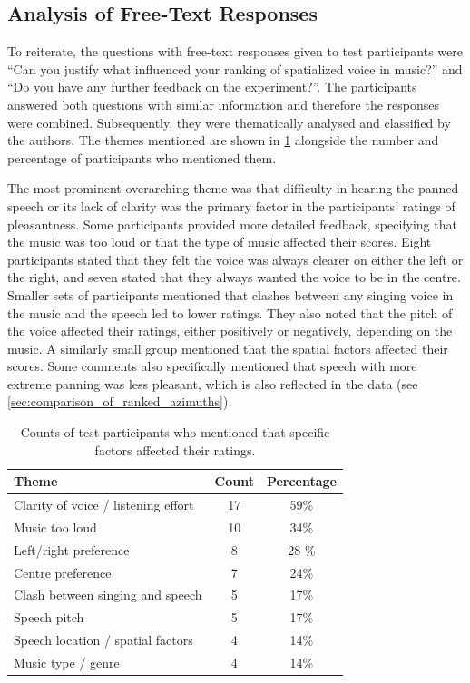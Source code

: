\documentclass[fleqn]{jaes}
\begin{document}
\subsection{Analysis of Free-Text Responses}
To reiterate, the questions with free-text responses given to test participants were \enquote{Can you justify what influenced your ranking of spatialized voice in music?} and \enquote{Do you have any further feedback on the experiment?}. The participants answered both questions with similar information and therefore the responses were combined. Subsequently, they were thematically analysed and classified by the authors. The themes mentioned are shown in \cref{table:freetextthemes} alongside the number and percentage of participants who mentioned them.

The most prominent overarching theme was that difficulty in hearing the panned speech or its lack of clarity was the primary factor in the participants' ratings of pleasantness. Some participants provided more detailed feedback, specifying that the music was too loud or that the type of music affected their scores. Eight participants stated that they felt the voice was always clearer on either the left or the right, and seven stated that they always wanted the voice to be in the centre. Smaller sets of participants mentioned that clashes between any singing voice in the music and the speech led to lower ratings. They also noted that the pitch of the voice affected their ratings, either positively or negatively, depending on the music. A similarly small group mentioned that the spatial factors affected their scores. Some comments also specifically mentioned that speech with more extreme panning was less pleasant, which is also reflected in the data (see \cref{sec:comparison_of_ranked_azimuths}).

\begin{table}[h]
    \centering
    \caption{Counts of test participants who mentioned that specific factors affected their ratings.}
    \begin{tabular}{lcc}
        \toprule
        Theme & Count & Percentage \\
        \midrule
        Clarity of voice / listening effort & 17 & 59\% \\
        Music too loud & 10 & 34\% \\
        Left/right preference & 8 & 28 \% \\
        Centre preference & 7 & 24\% \\
        Clash between singing and speech & 5 & 17\% \\
        Speech pitch & 5 & 17\% \\
        Speech location / spatial factors & 4 & 14\% \\
        Music type / genre & 4 & 14\% \\
        \bottomrule
    \end{tabular}
    \label{table:freetextthemes}
\end{table}
\end{document}
